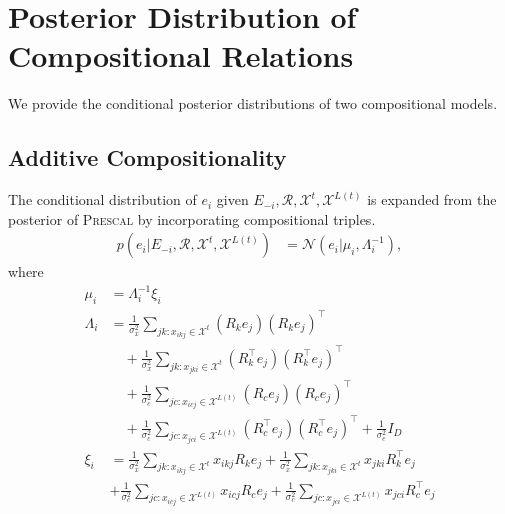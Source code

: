 \section{Posterior Distribution of Compositional Relations}

We provide the conditional posterior distributions of two compositional models.

\subsection{Additive Compositionality}
\label{sec:add_comp_posterior}
The conditional distribution of $e_i$ given $E_{-i}, \mathcal{R}, \mathcal{X}^{t}, \mathcal{X}^{L(t)}$ is
expanded from the posterior of \textsc{Prescal} by incorporating compositional triples.
\begin{align} \label{eqn:comp_sample_e}
p(e_i |E_{-i}, \mathcal{R}, \mathcal{X}^{t}, \mathcal{X}^{L(t)}) &= \mathcal{N}(e_i | \mu_i, \Lambda_i^{-1}),
\end{align}
where
\begin{align*}
\mu_i &= \Lambda_i^{-1}\xi_i \\
\Lambda_i &= \frac{1}{\sigma_x^2} \sum_{jk : x_{ikj} \in \mathcal{X}^{t}} (R_k e_j)(R_k e_j)^\top \\
&\quad+ \frac{1}{\sigma_x^2} \sum_{jk : x_{jki} \in \mathcal{X}^{t}} (R_k^\top e_j)(R_k^\top e_j)^\top \\
&\quad + \frac{1}{\sigma_c^2} \sum_{jc : x_{icj} \in \mathcal{X}^{L(t)}} (R_c e_j)(R_c e_j)^\top \\
&\quad+ \frac{1}{\sigma_c^2} \sum_{jc : x_{jci} \in \mathcal{X}^{L(t)}} (R_c^\top e_j)(R_c^\top e_j)^\top +
\frac{1}{\sigma_e^2} {I}_D \\
\xi_i &= \frac{1}{\sigma_x^2}\sum_{jk : x_{ikj} \in \mathcal{X}^{t}}  x_{ikj} R_{k} e_{j} + \frac{1}
{\sigma_x^2}\sum_{jk : x_{jki} \in \mathcal{X}^{t}} x_{jki} R_{k}^\top e_{j} \\
& + \frac{1}{\sigma_c^2}\sum_{jc : x_{icj} \in \mathcal{X}^{L(t)}}  x_{icj} R_{c} e_{j} + \frac{1}
{\sigma_c^2}\sum_{jc : x_{jci} \in \mathcal{X}^{L(t)}} x_{jci} R_{c}^\top e_{j}
\end{align*}

